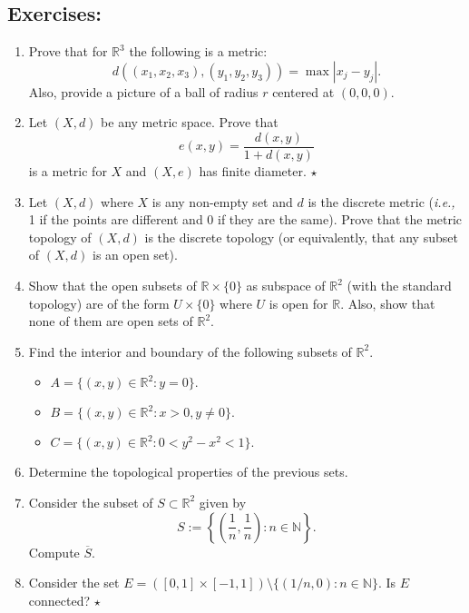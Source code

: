 \documentclass[
	fontsize=10pt, %
	twoside=false, %
	secnumdepth=1, %
]{kaobook}
\begin{document}
\subsection{Exercises:}

\begin{enumerate}

\item Prove that for $\mathbb{R}^3$ the following is a metric: $$d((x_1,x_2,x_3),(y_1,y_2,y_3))=\max |x_j-y_j|.$$ Also, provide a picture of a ball of radius $r$ centered at $(0,0,0).$

\item Let $(X,d)$ be any metric space. Prove that $$e(x,y)=\frac{d(x,y)}{1+d(x,y)}$$ is a metric for $X$ and $(X,e)$ has finite diameter. $\star$

\item Let $(X,d)$ where $X$ is any non-empty set and $d$ is the discrete metric (\emph{i.e.,} 1 if the points are different and 0 if they are the same). Prove that the metric topology of $(X,d)$ is the discrete topology (or equivalently, that any subset of $(X,d)$ is an open set).

\item Show that the open subsets of $\mathbb{R}\times\{0\}$ as subspace of $\mathbb{R}^2$ (with the standard topology) are of the form $U\times \{0\}$ where $U$ is open for $\mathbb{R}.$ Also, show that none of them are open sets of $\mathbb{R}^2.$

\item Find the interior and boundary of the following subsets of $\mathbb{R}^2.$
\begin{itemize}
\item $A=\{(x,y)\in\mathbb{R}^2: y=0\}.$
\item $B=\{(x,y)\in\mathbb{R}^2: x>0, y\neq 0\}.$
\item $C=\{(x,y)\in\mathbb{R}^2: 0<y^2-x^2<1\}.$
\end{itemize}

\item Determine the topological properties of the previous sets.

\item Consider the subset of $S\subset\mathbb{R}^2$ given by $$S:=\left\{\left(\frac{1}{n},\frac{1}{n}\right):n\in\mathbb{N}\right\}.$$ Compute $\overline{S}.$

\item Consider the set $E=([0,1]\times[-1,1]) \setminus \{(1/n,0): n\in\mathbb{N}\}.$ Is $E$ connected? $\star$


\end{enumerate}
\end{document}
